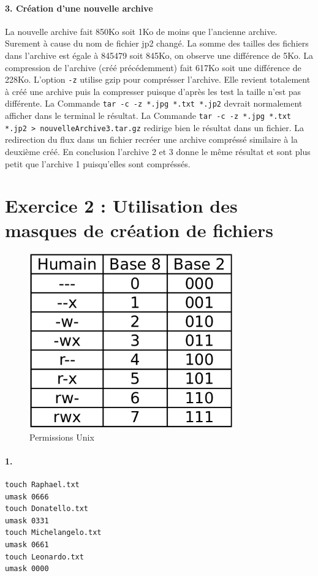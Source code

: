 \paragraph{3. Création d'une nouvelle archive}
La nouvelle archive fait 850Ko soit 1Ko de moins que l'ancienne archive. Surement à cause du nom de fichier jp2 changé.
La somme des tailles des fichiers dans l'archive est égale à 845479 soit 845Ko, on observe une différence de 5Ko.
La compression de l'archive (créé précédemment) fait 617Ko soit une différence de 228Ko.
L'option \texttt{-z} utilise gzip pour comprésser l'archive.
Elle revient totalement à créé une archive puis la compresser puisque d'après les test la taille n'est pas différente.
La Commande \texttt{tar -c -z *.jpg *.txt *.jp2} devrait normalement afficher dans le terminal le résultat.
La Commande \texttt{tar -c -z *.jpg *.txt *.jp2 > nouvelleArchive3.tar.gz} redirige bien le résultat dans un fichier.
La redirection du flux dans un fichier recréer une archive compréssé similaire à la deuxième créé.
En conclusion l'archive 2 et 3 donne le même résultat et sont plus petit que l'archive 1 puisqu'elles sont compréssés.

\section{Exercice 2 : Utilisation des masques de création de fichiers}
\begin{figure}[!h]
\centering
\includegraphics[width=250pt]{./shell/Pictures/permissions}
\caption{Permissions Unix}
\label{Permissions Unix}
\end{figure}

\paragraph{1.}
\begin{verbatim}
touch Raphael.txt
umask 0666
touch Donatello.txt
umask 0331
touch Michelangelo.txt
umask 0661
touch Leonardo.txt
umask 0000
\end{verbatim}

